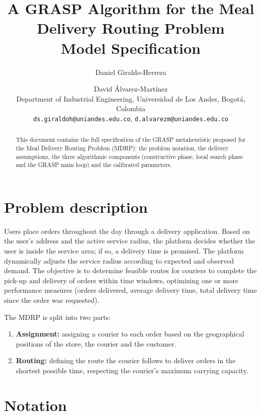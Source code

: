 \documentclass[11pt]{article}
\title{A GRASP Algorithm for the Meal Delivery Routing Problem\\[4pt]
       \large Model Specification}
\author{Daniel Giraldo-Herrera \and David \'Alvarez-Mart\'inez\\[2pt]
        \small Department of Industrial Engineering, Universidad de Los Andes, Bogot\'a, Colombia\\
        \small \texttt{ds.giraldoh@uniandes.edu.co}, \texttt{d.alvarezm@uniandes.edu.co}}
\date{}
\begin{document}
\maketitle

\begin{abstract}
This document contains the full specification of the GRASP metaheuristic
proposed for the Meal Delivery Routing Problem (MDRP): the problem notation,
the delivery assumptions, the three algorithmic components (constructive phase,
local search phase and the GRASP main loop) and the calibrated parameters.
\end{abstract}

\section{Problem description}

Users place orders throughout the day through a delivery application. Based on
the user's address and the active service radius, the platform decides whether
the user is inside the service area; if so, a delivery time is promised. The
platform dynamically adjusts the service radius according to expected and
observed demand. The objective is to determine feasible routes for couriers to
complete the pick-up and delivery of orders within time windows, optimizing one
or more performance measures (orders delivered, average delivery time, total
delivery time since the order was requested).

The MDRP is split into two parts:
\begin{enumerate}[label=(\roman*)]
  \item \textbf{Assignment:} assigning a courier to each order based on the
        geographical positions of the store, the courier and the customer.
  \item \textbf{Routing:} defining the route the courier follows to deliver
        orders in the shortest possible time, respecting the courier's maximum
        carrying capacity.
\end{enumerate}

\section{Notation}
\end{document}
